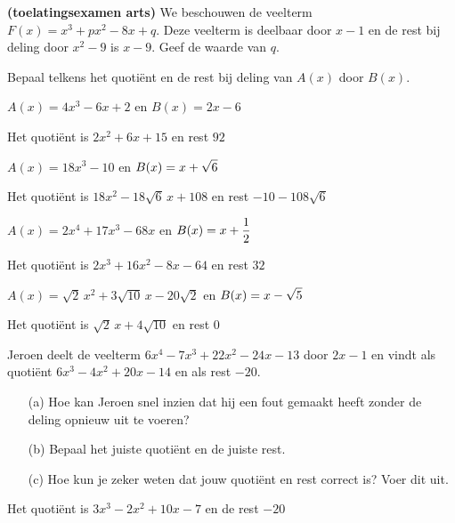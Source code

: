 \documentclass{ximera}
\begin{document}
\begin{exercise}
{\bf (toelatingsexamen arts)}
We beschouwen de veelterm $F(x) = x^3 + px^2 - 8x + q$. Deze veelterm is deelbaar door $x-1$ en de rest bij deling door $x^2-9$ is $x-9$. Geef de waarde van $q$.
\begin{multipleChoice}
\end{multipleChoice}
\end{exercise}

\begin{exercise}
Bepaal telkens het quotiënt en de rest bij deling van $A(x)$ door $B(x)$.

	\begin{question} $A(x) = 4x^3-6x+2$ \quad en \quad $B(x) = 2x-6$                                             \begin{uitkomst} Het quotiënt is $2x^2+6x+15$                 en rest $92$              \end{uitkomst} \end{question}
	\begin{question} $A(x) = 18x^3-10$ \quad en \quad $\displaystyle B(x) = x + \sqrt{6}$                                   \begin{uitkomst} Het quotiënt is $18x^2 - 18\sqrt{6}\,x+108$  en rest $-10-108\sqrt{6}$ \end{uitkomst} \end{question}
	\begin{question} $A(x) = 2x^4 + 17x^3 - 68x$ \quad en \quad $\displaystyle B(x) = x+\frac{1}{2}$                        \begin{uitkomst} Het quotiënt is $2x^3+16x^2-8x-64$           en rest $32$              \end{uitkomst} \end{question}
	\begin{question} $A(x) = \sqrt{2}\,x^2 + 3\sqrt{10}\,x - 20\sqrt{2}$ \quad en \quad $\displaystyle B(x) = x - \sqrt{5}$ \begin{uitkomst} Het quotiënt is $\sqrt{2}\,x+4\sqrt{10}$     en rest $0$               \end{uitkomst} \end{question}
\end{exercise}

\begin{exercise}
Jeroen deelt de veelterm $6x^4-7x^3+22x^2-24x-13$ door $2x-1$ en vindt als quotiënt $6x^3-4x^2+20x-14$ en als rest $-20$. 
\begin{enumerate}
\item[(a)]
Hoe kan Jeroen snel inzien dat hij een fout gemaakt heeft zonder de deling opnieuw uit te voeren? 
\item[(b)]
Bepaal het juiste quotiënt en de juiste rest.
\item[(c)]
Hoe kun je zeker weten dat jouw quotiënt en rest correct is? Voer dit uit.
\end{enumerate}
\begin{uitkomst} Het quotiënt is $3x^3-2x^2+10x-7$ en de rest $-20$ \end{uitkomst}
\end{exercise}
\end{document}
